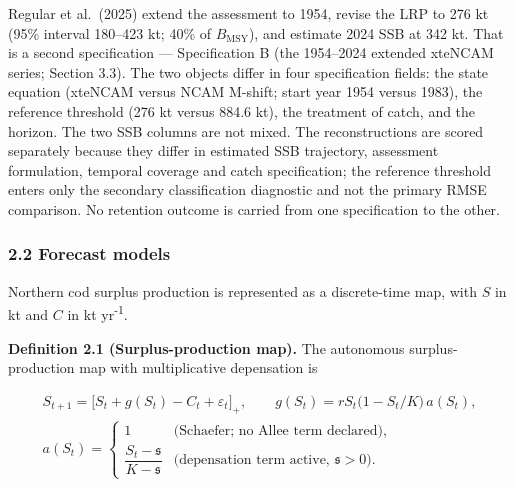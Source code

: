 \documentclass[11pt]{article}
\begin{document}
Regular et al.~(2025) extend the assessment to 1954, revise the LRP to
276 kt (95\% interval 180--423 kt; 40\% of \(B_{\mathrm{MSY}}\)), and
estimate 2024 SSB at 342 kt. That is a second specification ---
Specification B (the 1954--2024 extended xteNCAM series; Section 3.3).
The two objects differ in four specification fields: the state equation
(xteNCAM versus NCAM M-shift; start year 1954 versus 1983), the
reference threshold (276 kt versus 884.6 kt), the treatment of catch,
and the horizon.
The two SSB columns are not mixed. The reconstructions are scored separately because they differ in
estimated SSB trajectory, assessment formulation, temporal coverage and
catch specification; the reference threshold enters only the secondary
classification diagnostic and not the primary RMSE comparison. No
retention outcome is carried from one specification to the other.

\subsubsection{2.2 Forecast models}\label{forecast-models}

Northern cod surplus production is represented as a discrete-time map,
with \(S\) in kt and \(C\) in kt yr\textsuperscript{-1}.

\textbf{Definition 2.1 (Surplus-production map).} The autonomous
surplus-production map with multiplicative depensation is

\[
\begin{gathered}
S_{t+1}=\bigl[S_t+g(S_t)-C_t+\varepsilon_t\bigr]_+,
\qquad
g(S_t)=rS_t\bigl(1-S_t/K\bigr)\,a(S_t),
\\
a(S_t)=
\begin{cases}
1 & \text{(Schaefer; no Allee term declared)},\\[2pt]
\dfrac{S_t-\mathfrak s}{K-\mathfrak s} & \text{(depensation term active, $\mathfrak s>0$)}.
\end{cases}
\end{gathered}
\]
\end{document}
